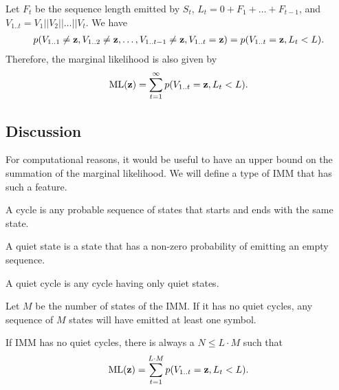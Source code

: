 Let $F_t$ be the sequence length emitted by $S_t$, $L_t = 0+F_1+\dots+F_{t-1}$,
and $V_{1..t} = V_1||V_2||\dots||V_t$.
We have
\begin{align*}
  p(V_{1..1} \neq \mathbf{z}, V_{1..2} \neq \mathbf{z}, \dots, V_{1..{t-1}} \neq \mathbf{z}, V_{1..t}=\mathbf{z})
  = p(V_{1..t}=\mathbf{z}, L_t<L).
\end{align*}
Therefore, the marginal likelihood is also given by
\begin{align*}
  \mathrm{ML}(\mathbf{z}) = \sum_{t=1}^{\infty} p(V_{1..t}=\mathbf{z}, L_t<L).
\end{align*}

\subsection{Discussion}

For computational reasons, it would be useful to have an upper bound on the summation of the
marginal likelihood.
We will define a type of IMM that has such a feature.

\begin{definition}
  A cycle is any probable sequence of states that starts and ends with the same state.
\end{definition}

\begin{definition}
  A quiet state is a state that has a non-zero probability of emitting an empty sequence.
\end{definition}

\begin{definition}
  A quiet cycle is any cycle having only quiet states.
\end{definition}

\begin{corollary}
  Let $M$ be the number of states of the IMM. If it has no quiet cycles, any sequence of $M$ states
  will have emitted at least one symbol.
\end{corollary}

If IMM has no quiet cycles, there is always a $N \leq L\cdot M$ such that
\begin{align*}
  \mathrm{ML}(\mathbf{z}) = \sum_{t=1}^{L\cdot M} p(V_{1..t}=\mathbf{z}, L_t<L).
\end{align*}
